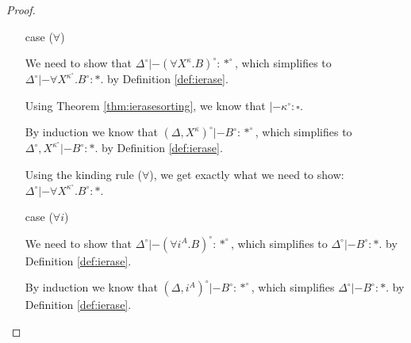 \documentclass[preprint]{sigplanconf}
\theoremstyle{plain}
\theoremstyle{remark}
\theoremstyle{definition}
\begin{document}
\begin{proof}
\begin{itemize}
\item[case] ($\forall$)

	We need to show that
	$\Delta^\circ |- (\forall X^\kappa.B)^\circ : *^\circ$,
	which simplifies to
	$\Delta^\circ |- \forall X^{\kappa^\circ}.B^\circ : *$.
	by Definition \ref{def:ierase}.

	Using Theorem \ref{thm:ierasesorting}, we know that
	$|- \kappa^\circ : \square$.

	By induction we know that
	$(\Delta,X^\kappa)^\circ |- B^\circ : *^\circ$,
	which simplifies to
	$\Delta^\circ,X^{\kappa^\circ} |- B^\circ : *$.
	by Definition \ref{def:ierase}.

	Using the kinding rule ($\forall$), we get exactly
	what we need to show:
	$\Delta^\circ |- \forall X^{\kappa^\circ}.B^\circ : *$.

\item[case] ($\forall i$)

	We need to show that
	$\Delta^\circ |- (\forall i^A.B)^\circ : *^\circ$,
	which simplifies to $\Delta^\circ |- B^\circ : *$.
	by Definition \ref{def:ierase}.

	By induction we know that
	$(\Delta,i^A)^\circ |- B^\circ : *^\circ$,
	which simplifies $\Delta^\circ |- B^\circ : *$.
	by Definition \ref{def:ierase}.

\end{itemize}
\end{proof}
\end{document}
